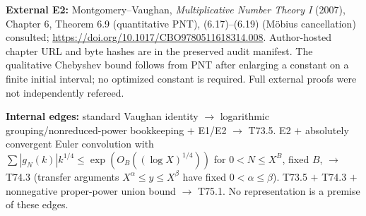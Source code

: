 \documentclass[10pt,a4paper]{article}
\begin{document}
\textbf{External E2:} Montgomery--Vaughan, \emph{Multiplicative Number Theory I} (2007), Chapter 6, Theorem 6.9 (quantitative PNT), (6.17)--(6.19) (M\"obius cancellation) consulted; \url{https://doi.org/10.1017/CBO9780511618314.008}. Author-hosted chapter URL and byte hashes are in the preserved audit manifest. The qualitative Chebyshev bound follows from PNT after enlarging a constant on a finite initial interval; no optimized constant is required. Full external proofs were not independently refereed.

\textbf{Internal edges:} standard Vaughan identity $\longrightarrow$ logarithmic grouping/nonreduced-power bookkeeping $+$ E1/E2 $\longrightarrow$ T73.5. E2 $+$ absolutely convergent Euler convolution with $\sum|g_N(k)|k^{1/4}\le\exp(O_B((\log X)^{1/4}))$ for $0<N\le X^B$, fixed $B$, $\longrightarrow$ T74.3 (transfer arguments $X^\alpha\le y\le X^\beta$ have fixed $0<\alpha\le\beta$). T73.5 $+$ T74.3 $+$ nonnegative proper-power union bound $\longrightarrow$ T75.1. No representation is a premise of these edges.
\end{document}
